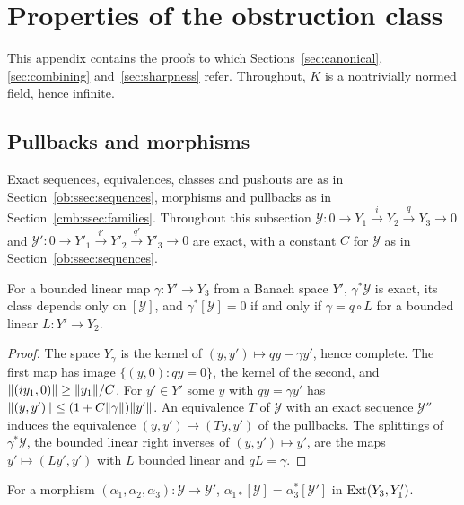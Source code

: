 \section{Properties of the obstruction class}\label{app:obstruction-class}

This appendix contains the proofs to which Sections~\ref{sec:canonical}, \ref{sec:combining} and~\ref{sec:sharpness}
refer. Throughout, $K$ is a nontrivially normed field, hence infinite.

\subsection{Pullbacks and morphisms}\label{ocl:ssec:sequences}

Exact sequences, equivalences, classes and pushouts are as in Section~\ref{ob:ssec:sequences}, morphisms and pullbacks
as in Section~\ref{cmb:ssec:families}. Throughout this subsection $\mathcal Y\colon0\to Y_1\xrightarrow iY_2\xrightarrow
qY_3\to0$ and $\mathcal Y'\colon0\to Y'_1\xrightarrow{i'}Y'_2\xrightarrow{q'}Y'_3\to0$ are exact, with a constant $C$
for $\mathcal Y$ as in Section~\ref{ob:ssec:sequences}.

\begin{lemma}\label{ocl:lem:pullback}
For a bounded linear map $\gamma\colon Y'\to Y_3$ from a Banach space $Y'$, $\gamma^*\mathcal Y$ is exact, its class
depends only on $[\mathcal Y]$, and $\gamma^*[\mathcal Y]=0$ if and only if $\gamma=q\circ L$ for a bounded linear
$L\colon Y'\to Y_2$.
\end{lemma}

\begin{proof}
The space $Y_\gamma$ is the kernel of $(y,y')\mapsto qy-\gamma y'$, hence complete. The first map has image
$\{(y,0):qy=0\}$, the kernel of the second, and $\lVert (iy_1,0)\rVert\ge\lVert y_1\rVert/C$. For $y'\in Y'$ some $y$ with
$qy=\gamma y'$ has $\lVert (y,y')\rVert\le(1+C\lVert \gamma\rVert)\lVert y'\rVert$. An equivalence $T$ of $\mathcal Y$ with an exact
sequence $\mathcal Y''$ induces the equivalence $(y,y')\mapsto(Ty,y')$ of the pullbacks. The splittings of
$\gamma^*\mathcal Y$, the bounded linear right inverses of $(y,y')\mapsto y'$, are the maps $y'\mapsto(Ly',y')$ with $L$
bounded linear and $qL=\gamma$.
\end{proof}

\begin{lemma}\label{ocl:lem:morphism}
For a morphism $(\alpha_1,\alpha_2,\alpha_3)\colon\mathcal Y\to\mathcal Y'$, $\alpha_{1*}[\mathcal
Y]=\alpha_3^*[\mathcal Y']$ in $\operatorname{Ext}(Y_3,Y'_1)$.
\end{lemma}

